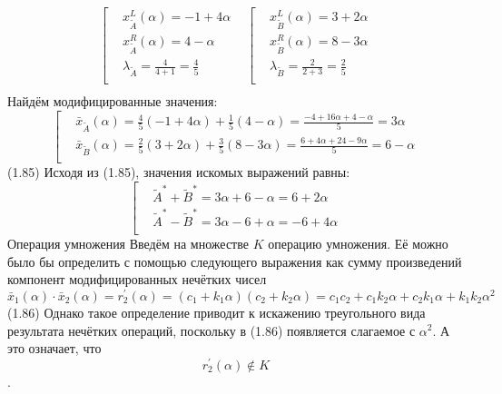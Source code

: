 	\[\begin{matrix}
   \left[ \begin{aligned}
  & x_{{\tilde{A}}}^{L}\left( \alpha  \right)=-1+4\alpha  \\ 
 & x_{{\tilde{A}}}^{R}\left( \alpha  \right)=4-\alpha  \\ 
 & {{\lambda }_{{\tilde{A}}}}=\frac{4}{4+1}=\frac{4}{5} \\ 
\end{aligned} \right. & \left[ \begin{aligned}
  & x_{{\tilde{B}}}^{L}\left( \alpha  \right)=3+2\alpha  \\ 
 & x_{{\tilde{B}}}^{R}\left( \alpha  \right)=8-3\alpha  \\ 
 & {{\lambda }_{{\tilde{B}}}}=\frac{2}{2+3}=\frac{2}{5} \\ 
\end{aligned} \right.  \\
\end{matrix}\] 
Найдём модифицированные значения:
	\[\left[ \begin{aligned}
  & {{{\bar{x}}}_{{\tilde{A}}}}\left( \alpha  \right)=\frac{4}{5}\left( -1+4\alpha  \right)+\frac{1}{5}\left( 4-\alpha  \right)=\frac{-4+16\alpha +4-\alpha }{5}=3\alpha  \\ 
 & {{{\bar{x}}}_{{\tilde{B}}}}\left( \alpha  \right)=\frac{2}{5}\left( 3+2\alpha  \right)+\frac{3}{5}\left( 8-3\alpha  \right)=\frac{6+4\alpha +24-9\alpha }{5}=6-\alpha  \\ 
\end{aligned} \right.\] 	(1.85)
Исходя из (1.85), значения искомых выражений равны:
	\[\left[ \begin{aligned}
  & {{{\tilde{A}}}^{*}}+{{{\tilde{B}}}^{*}}=3\alpha +6-\alpha =6+2\alpha  \\ 
 & {{{\tilde{A}}}^{*}}-{{{\tilde{B}}}^{*}}=3\alpha -6+\alpha =-6+4\alpha  \\ 
\end{aligned} \right.\] 
Операция умножения
Введём на множестве $K$ операцию умножения. Её можно было бы определить с помощью следующего выражения как сумму произведений компонент модифицированных нечётких чисел
	\[{{\bar{x}}_{1}}(\alpha )\cdot {{\bar{x}}_{2}}(\alpha )=r_{2}^{'}\left( \alpha  \right)=\left( {{c}_{1}}+{{k}_{1}}\alpha  \right)\left( {{c}_{2}}+{{k}_{2}}\alpha  \right)={{c}_{1}}{{c}_{2}}+{{c}_{1}}{{k}_{2}}\alpha +{{c}_{2}}{{k}_{1}}\alpha +{{k}_{1}}{{k}_{2}}{{\alpha }^{2}}\] 	(1.86)
Однако такое определение приводит к искажению треугольного вида результата нечётких операций, поскольку в (1.86) появляется слагаемое с ${{\alpha }^{2}}$. А это означает, что \[r_{2}^{'}\left( \alpha  \right)\notin K\].
